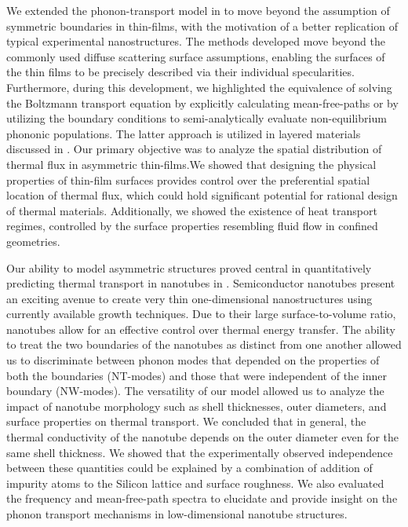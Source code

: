 \par We extended the phonon-transport model in  to move beyond the assumption of symmetric boundaries in thin-films, with the motivation of a better replication of typical experimental nanostructures. The methods developed move beyond the commonly used diffuse scattering surface assumptions, enabling the surfaces of the thin films to be precisely described via their individual specularities. Furthermore, during this development, we highlighted the equivalence of solving the Boltzmann transport equation by explicitly calculating mean-free-paths or by utilizing the boundary conditions to semi-analytically evaluate non-equilibrium phononic populations. The latter approach is utilized in layered materials discussed in . Our primary objective was to analyze the spatial distribution of thermal flux in asymmetric thin-films.We showed that designing the physical properties of thin-film surfaces provides control over the preferential spatial location of thermal flux, which could hold significant potential for rational design of thermal materials. Additionally, we showed the existence of heat transport regimes, controlled by the surface properties resembling fluid flow in confined geometries.
 
\par Our ability to model asymmetric structures proved central in quantitatively predicting thermal transport in nanotubes in . Semiconductor nanotubes present an exciting avenue to create very thin one-dimensional nanostructures using currently available growth techniques. Due to their large surface-to-volume ratio, nanotubes allow for an effective control over thermal energy transfer. The ability to treat the two boundaries of the nanotubes as distinct from one another allowed us to discriminate between phonon modes that depended on the properties of both the boundaries (NT-modes) and those that were independent of the inner boundary (NW-modes). The versatility of our model allowed us to analyze the impact of nanotube morphology such as shell thicknesses, outer diameters, and surface properties on thermal transport. We concluded that in general, the thermal conductivity of the nanotube depends on the outer diameter even for the same shell thickness. We showed that the experimentally observed independence between these quantities could be explained by a combination of addition of impurity atoms to the Silicon lattice and surface roughness. We also evaluated the frequency and mean-free-path spectra to elucidate and provide insight on the phonon transport mechanisms in low-dimensional nanotube structures.

